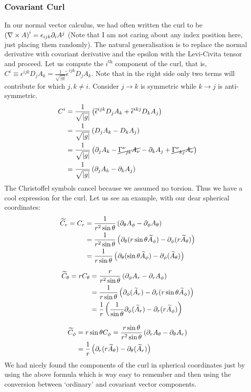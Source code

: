 \subsubsection{Covariant Curl}
In our normal vector calculus, we had often written the curl to be $\left( \nabla\times A \right)^i = \epsilon_{ijk}\partial_i A^j$ (Note that I am not caring about any index position here, just placing them randomly). The natural generalisation is to replace the normal derivative with covariant derivative and the epsilon with the Levi-Civita tensor and proceed. Let us compute the $i^{\text{th}}$ component of the curl, that is, $C^i \equiv \epsilon^{ijk}D_j A_k =\frac{1}{\sqrt{|g|}}\widetilde{\epsilon}^{ijk}D_j A_k $. Note that in the right side only two terms will contribute for which $j,k \neq i$. Consider $j\rightarrow k$ is symmetric while $k\rightarrow j$ is anti-symmetric. 
\begin{align*}
    C^i &= \frac{1}{\sqrt{|g|}}\brac{\widetilde{\epsilon}^{ijk}D_j A_k+\widetilde{\epsilon}^{ikj}D_k A_j }\\
    &=\frac{1}{\sqrt{|g|}}\brac{D_j A_k-D_k A_j }\\
    &=\frac{1}{\sqrt{|g|}}\brac{\partial_j A_k- \cancel{\tensor{\Gamma}{^\nu _{jk}}A_\nu} -\partial_k A_j + \cancel{\tensor{\Gamma}{^\nu _{kj}}A_\nu}}\\
    &=\frac{1}{\sqrt{|g|}} \brac{\partial_j A_k-\partial_k A_j}
\end{align*}
The Christoffel symbols cancel because we assumed no torsion. Thus we have a cool expression for the curl. Let us see an example, with our dear spherical coordinates:
\begin{align*}
    \widetilde{C}_r = C_r &= \frac{1}{r^2\sin \theta}\left( \partial_\theta A_\phi - \partial_\phi A_\theta \right)\\
    &=\frac{1}{r^2\sin \theta}\left( \partial_\theta (r\sin\theta \widetilde{A}_\phi) - \partial_\phi (r\widetilde{A}_\theta) \right)\\
    &=\frac{1}{r\sin \theta}\left( \partial_\theta (\sin\theta \widetilde{A}_\phi) - \partial_\phi (\widetilde{A}_\theta) \right)
\end{align*}

\begin{align*}
    \widetilde{C}_\theta = rC_\theta &= \frac{r}{r^2\sin \theta}\left( \partial_\phi A_r - \partial_r A_\phi \right)\\
    &=\frac{1}{r\sin \theta}\left( \partial_\phi (\widetilde{A}_r) - \partial_r (r\sin\theta\widetilde{A}_\phi) \right)\\
    &=\frac{1}{r}\left( \frac{1}{\sin \theta}\partial_\phi (\widetilde{A}_r) - \partial_r (r\widetilde{A}_\phi) \right)
\end{align*}

\begin{align*}
    \widetilde{C}_\phi &= r\sin\theta C_\phi = \frac{r\sin\theta}{r^2\sin \theta}\left( \partial_r A_\theta- \partial_\theta A_r \right)\\
    &=\frac{1}{r}\left( \partial_r (r\widetilde{A}_\theta) - \partial_\theta (\widetilde{A}_r) \right)
\end{align*}
We had nicely found the components of the curl in spherical coordinates just by using the above formula which is way easy to remember and then using the conversion between `ordinary' and covariant vector components. 